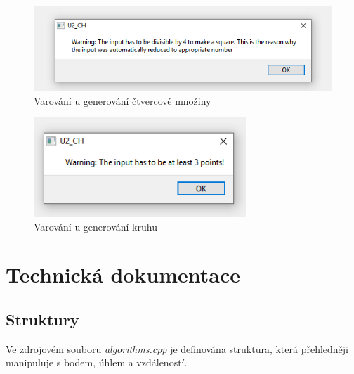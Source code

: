 \documentclass[a4paper,11pt,twoside]{article}
\begin{document}
\begin{figure}[hbt!] 
\begin{center}
\includegraphics[width=12cm]{pictures/warning_rectangle.png} 
\caption[Varování u generování čtvercové množiny]{Varování u generování čtvercové množiny}
\label{fig:var}
\end{center}
\end{figure}
\vspace{-0.4cm}

\begin{figure}[hbt!] 
\begin{center}
\includegraphics[width=8cm]{pictures/warning_ellipse.png} 
\caption[Varování u generování kruhu]{Varování u generování kruhu}
\label{fig:var2}
\end{center}
\end{figure}
\vspace{-0.4cm}



\newpage
{}

\vspace*{-1cm}
\section{Technická dokumentace}

\subsection{Struktury}
Ve zdrojovém souboru \textit{algorithms.cpp} je definována struktura, která přehledněji manipuluje s bodem, úhlem a vzdáleností.
\end{document}
